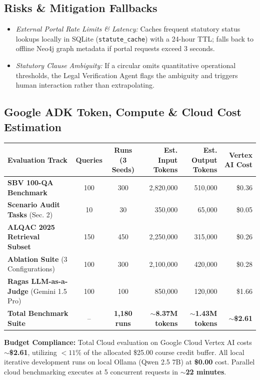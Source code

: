 \documentclass[10pt,a4paper]{article}
\begin{document}
\subsection{Risks \& Mitigation Fallbacks}
\begin{itemize}[leftmargin=11pt]
  \item \textit{External Portal Rate Limits \& Latency:} Caches frequent statutory status lookups locally in SQLite (\texttt{statute\_cache}) with a 24-hour TTL; falls back to offline Neo4j graph metadata if portal requests exceed 3 seconds.
  \item \textit{Statutory Clause Ambiguity:} If a circular omits quantitative operational thresholds, the Legal Verification Agent flags the ambiguity and triggers human interaction rather than extrapolating.
\end{itemize}

\subsection{Google ADK Token, Compute \& Cloud Cost Estimation}
\begin{center}
\small
\begin{tabularx}{\linewidth}{@{}l c c r r r@{}}
  \toprule
  \textbf{Evaluation Track} & \textbf{Queries} & \textbf{Runs (3 Seeds)} & \textbf{Est. Input Tokens} & \textbf{Est. Output Tokens} & \textbf{Vertex AI Cost} \\
  \midrule
  \textbf{SBV 100-QA Benchmark}~\cite{phan2026sbvlawgraph} & 100 & 300 & 2,820,000 & 510,000 & \$0.36 \\
  \textbf{Scenario Audit Tasks} (Sec. 2) & 10  & 30  & 350,000   & 65,000  & \$0.05 \\
  \textbf{ALQAC 2025 Retrieval Subset}~\cite{alqac2025} & 150 & 450 & 2,250,000 & 315,000 & \$0.26 \\
  \textbf{Ablation Suite} (3 Configurations) & 100 & 300 & 2,100,000 & 420,000 & \$0.28 \\
  \textbf{Ragas LLM-as-a-Judge} (Gemini 1.5 Pro) & 100 & 100 & 850,000 & 120,000 & \$1.66 \\
  \midrule
  \textbf{Total Benchmark Suite} & -- & \textbf{1,180 runs} & \textbf{$\sim$8.37M tokens} & \textbf{$\sim$1.43M tokens} & \textbf{$\sim$\$2.61} \\
  \bottomrule
\end{tabularx}
\end{center}

\textbf{Budget Compliance:} Total Cloud evaluation on Google Cloud Vertex AI costs \textbf{$\sim$\$2.61}, utilizing $<11\%$ of the allocated \$25.00 course credit buffer. All local iterative development runs on local Ollama (Qwen 2.5 7B) at \textbf{\$0.00} cost. Parallel cloud benchmarking executes at 5 concurrent requests in \textbf{$\sim$22 minutes}.
\end{document}
